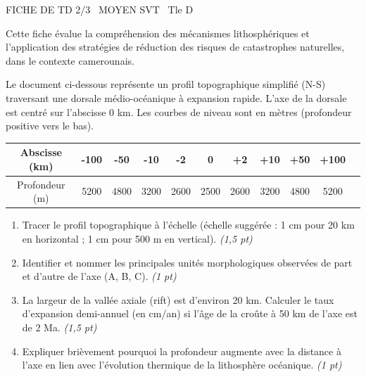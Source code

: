 \documentclass[11pt]{article}
\begin{document}
\begin{tcolorbox}[enhanced,colback=popink,colframe=popink,arc=10pt,boxrule=0pt,left=12pt,right=12pt,top=9pt,bottom=9pt]
{\color{white}\popxbold\small FICHE DE TD 2/3 \textbullet\ MOYEN \hfill SVT \textbullet\ Tle D\par}
\end{tcolorbox}
\vspace{4pt}
\noindent Cette fiche évalue la compréhension des mécanismes lithosphériques et l'application des stratégies de réduction des risques de catastrophes naturelles, dans le contexte camerounais.

\begin{exercice}
\noindent Le document ci-dessous représente un profil topographique simplifié (N-S) traversant une dorsale médio-océanique à expansion rapide. L'axe de la dorsale est centré sur l'abscisse 0 km. Les courbes de niveau sont en mètres (profondeur positive vers le bas).

\begin{center}
\begin{tabular}{|c|c|c|c|c|c|c|c|c|c|c|}
\hline
Abscisse (km) & -100 & -50 & -10 & -2 & 0 & +2 & +10 & +50 & +100 \\
\hline
Profondeur (m) & 5200 & 4800 & 3200 & 2600 & 2500 & 2600 & 3200 & 4800 & 5200 \\
\hline
\end{tabular}
\end{center}

\begin{enumerate}
    \item Tracer le profil topographique à l'échelle (échelle suggérée : 1 cm pour 20 km en horizontal ; 1 cm pour 500 m en vertical). \textit{(1,5 pt)}
    \item Identifier et nommer les principales unités morphologiques observées de part et d'autre de l'axe (A, B, C). \textit{(1 pt)}
    \item La largeur de la vallée axiale (rift) est d'environ 20 km. Calculer le taux d'expansion demi-annuel (en cm/an) si l'âge de la croûte à 50 km de l'axe est de 2 Ma. \textit{(1,5 pt)}
    \item Expliquer brièvement pourquoi la profondeur augmente avec la distance à l'axe en lien avec l'évolution thermique de la lithosphère océanique. \textit{(1 pt)}
\end{enumerate}
\end{exercice}
\end{document}
